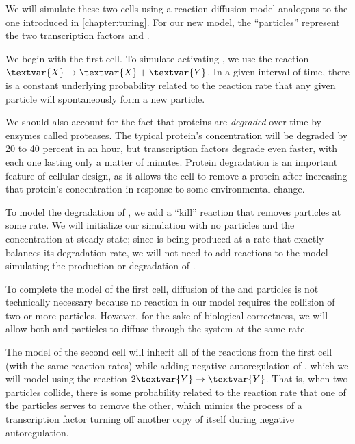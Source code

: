 We will simulate these two cells using a reaction-diffusion model analogous to the one introduced in \autoref{chapter:turing}. For our new model, the ``particles'' represent the two transcription factors  and .

We begin with the first cell. To simulate  activating , we use the reaction $\textvar{X} \rightarrow \textvar{X} + \textvar{Y}$. In a given interval of time, there is a constant underlying probability related to the reaction rate that any given  particle will spontaneously form a new  particle.

We should also account for the fact that proteins are \textit{degraded} over time by enzymes called proteases. The typical protein's concentration will be degraded by 20 to 40 percent in an hour, but transcription factors degrade even faster, with each one lasting only a matter of minutes. Protein degradation is an important feature  of cellular design, as it allows the cell to remove a protein after increasing that protein's concentration in response to some environmental change.

To model the degradation of , we add a ``kill'' reaction that removes  particles at some rate. We will initialize our simulation with no  particles and the  concentration at steady state; since  is being produced at a rate that exactly balances its degradation rate, we will not need to add reactions to the model simulating the production or degradation of .

To complete the model of the first cell, diffusion of the  and  particles is not technically necessary because no reaction in our model requires the collision of two or more particles. However, for the sake of biological correctness, we will allow both  and  particles to diffuse through the system at the same rate.\\

\begin{qbox}\end{qbox}

The model of the second cell will inherit all of the reactions from the first cell (with the same reaction rates) while adding negative autoregulation of , which we will model using the reaction $2\textvar{Y} \rightarrow \textvar{Y}$. That is, when two  particles collide, there is some probability related to the reaction rate that one of the particles serves to remove the other, which mimics the process of a transcription factor turning off another copy of itself during negative autoregulation.

